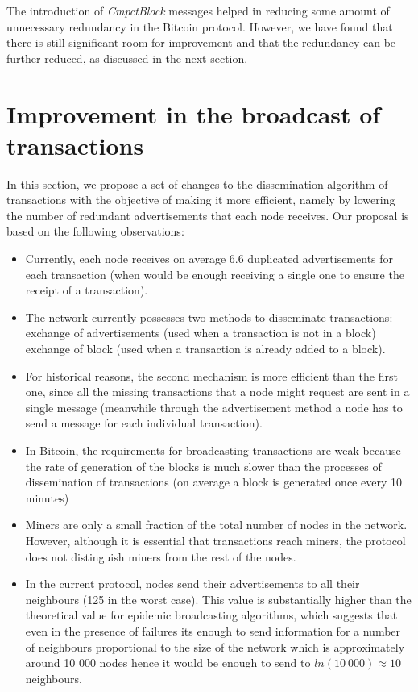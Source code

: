 \documentclass{dads}   %
\begin{document}
The introduction of \textsl{CmpctBlock} messages helped in reducing some amount of unnecessary redundancy in the Bitcoin protocol. However, we have found that there is still significant room for improvement and that the redundancy can be further reduced, as discussed in the next section.

\section{Improvement in the broadcast of transactions}
In this section, we propose a set of changes to the dissemination algorithm of transactions with the objective of making it more efficient, namely by lowering the number of redundant advertisements that each node receives. Our proposal is based on the following observations:

\begin{itemize}
  \item Currently, each node receives on average $6.6$ duplicated advertisements for each transaction (when would be enough receiving a single one to ensure the receipt of a transaction).
  \item The network currently possesses two methods to disseminate transactions: exchange of advertisements (used when a transaction is not in a block) exchange of block (used when a transaction is already added to a block).
  \item For historical reasons, the second mechanism is more efficient than the first one, since all the missing transactions that a node might request are sent in a single message (meanwhile through the advertisement method a node has to send a message for each individual transaction).
  \item In Bitcoin, the requirements for broadcasting transactions are weak because the rate of generation of the blocks is much slower than the processes of dissemination of transactions (on average a block is generated once every 10 minutes)
  \item Miners are only a small fraction of the total number of nodes in the network. However, although it is essential that transactions reach miners, the protocol does not distinguish miners from the rest of the nodes.
  \item In the current protocol, nodes send their advertisements to all their neighbours (125 in the worst case). This value is substantially higher than the theoretical value for epidemic broadcasting algorithms, which suggests that even in the presence of failures its enough to send information for a number of neighbours proportional to the size of the network which is approximately around 10 000 nodes hence it would be enough to send to $ ln(10~000) \approx 10$ neighbours.
\end{itemize}
\end{document}
